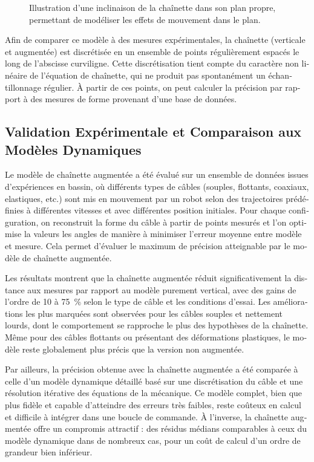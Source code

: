 \begin{otherlanguage}{french}
	\begin{figure}
		\centering
		\caption{
			Illustration d'une inclinaison de la chaînette dans son plan propre, permettant de modéliser les effets de mouvement dans le plan.
		}
	\end{figure}

	Afin de comparer ce modèle à des mesures expérimentales, la chaînette (verticale et augmentée) est
	discrétisée en un ensemble de points régulièrement espacés le long de l'abscisse curviligne. Cette
	discrétisation tient compte du caractère non linéaire de l'équation de chaînette, qui ne produit
	pas spontanément un échantillonnage régulier. À partir de ces points, on peut calculer la précision
	par rapport à des mesures de forme provenant d'une base de données.

	\subsection{Validation Expérimentale et Comparaison aux Modèles Dynamiques}

	Le modèle de chaînette augmentée a été évalué sur un ensemble de données issues d'expériences en
	bassin, où différents types de câbles (souples, flottants, coaxiaux, elastiques, etc.) sont mis en
	mouvement par un robot selon des trajectoires prédéfinies à différentes vitesses et avec
	différentes position initiales. Pour chaque configuration, on reconstruit la forme du câble à
	partir de points mesurés et l'on optimise la valeurs les angles de manière à minimiser l'erreur
	moyenne entre modèle et mesure. Cela permet d'évaluer le maximum de précision atteignable par le
	modèle de chaînette augmentée.

	Les résultats montrent que la chaînette augmentée réduit significativement la distance aux mesures
	par rapport au modèle purement vertical, avec des gains de l'ordre de 10 à 75~\% selon le type de
	câble et les conditions d'essai. Les améliorations les plus marquées sont observées pour les câbles
	souples et nettement lourds, dont le comportement se rapproche le plus des hypothèses de la
	chaînette. Même pour des câbles flottants ou présentant des déformations plastiques, le modèle
	reste globalement plus précis que la version non augmentée.

	Par ailleurs, la précision obtenue avec la chaînette augmentée a été comparée à celle d'un modèle
	dynamique détaillé basé sur une discrétisation du câble et une résolution itérative des équations
	de la mécanique. Ce modèle complet, bien que plus fidèle et capable d'atteindre des erreurs très
	faibles, reste coûteux en calcul et difficile à intégrer dans une boucle de commande. À l'inverse,
	la chaînette augmentée offre un compromis attractif : des résidus médians comparables à ceux du
	modèle dynamique dans de nombreux cas, pour un coût de calcul d'un ordre de grandeur bien
	inférieur.


\end{otherlanguage}
